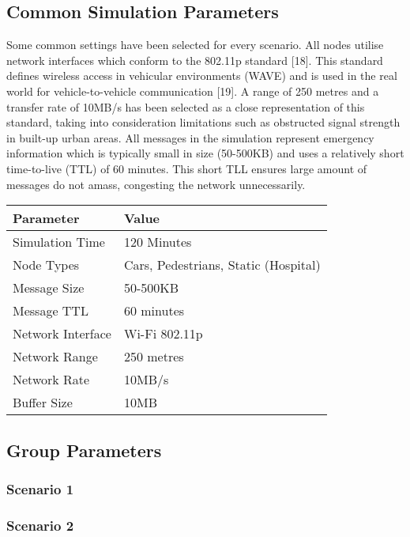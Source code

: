 \documentclass{article}
\begin{document}
\subsection{Common Simulation Parameters}
\newline Some common settings have been selected for every scenario. All nodes utilise network interfaces which conform to the 802.11p standard [18]. This standard defines wireless access in vehicular environments (WAVE) and is used in the real world for vehicle-to-vehicle communication [19]. A range of 250 metres and a transfer rate of 10MB/s has been selected as a close representation of this standard, taking into consideration limitations such as obstructed signal strength in built-up urban areas. All messages in the simulation represent emergency information which is typically small in size (50-500KB) and uses a relatively short time-to-live (TTL) of 60 minutes. This short TLL ensures large amount of messages do not amass, congesting the network unnecessarily.\\
\begin{center}
\begin{tabular}{|l|l|}
\hline
\textbf{Parameter} & \textbf{Value} \\ \hline
Simulation Time & 120 Minutes \\ \hline
Node Types & Cars, Pedestrians, Static (Hospital) \\ \hline
Message Size & 50-500KB \\ \hline
Message TTL & 60 minutes \\ \hline
Network Interface & Wi-Fi 802.11p \\ \hline
Network Range & 250 metres \\ \hline
Network Rate & 10MB/s \\ \hline
Buffer Size & 10MB \\ \hline
\end{tabular}
\end{center}

\subsection{Group Parameters}
\subsubsection{Scenario 1}
\subsubsection{Scenario 2}
\end{document}
